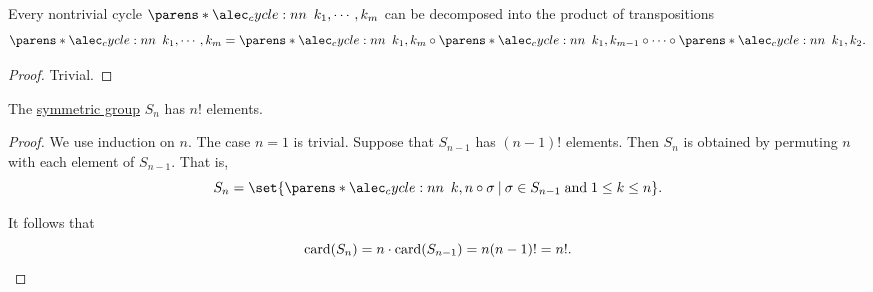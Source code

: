 \begin{proposition}\label{thm:cycle_transposition_decomposition}
  Every nontrivial cycle \( \cycle{ k_1, \cdots, k_m } \) can be decomposed into the product of transpositions
  \begin{equation*}
    \cycle{ k_1, \cdots, k_m } = \cycle{ k_1, k_m } \bincirc \cycle{ k_1, k_{m-1} } \bincirc \cdots \bincirc \cycle{ k_1, k_2 }.
  \end{equation*}
\end{proposition}
\begin{proof}
  Trivial.
\end{proof}

\begin{proposition}\label{thm:symmetric_group_cardinality}
  The \hyperref[def:symmetric_group]{symmetric group} \( S_n \) has \( n! \) elements.
\end{proposition}
\begin{proof}
  We use induction on \( n \). The case \( n = 1 \) is trivial. Suppose that \( S_{n-1} \) has \( (n-1)! \) elements. Then \( S_n \) is obtained by permuting \( n \) with each element of \( S_{n-1} \). That is,
  \begin{equation*}
    S_n = \set{ \cycle{ k, n } \bincirc \sigma \given \sigma \in S_{n-1} \T{and} 1 \leq k \leq n }.
  \end{equation*}

  It follows that
  \begin{equation*}
    \operatorname{card}(S_n) = n \cdot \operatorname{card}(S_{n-1}) = n (n-1)! = n!.
  \end{equation*}
\end{proof}

